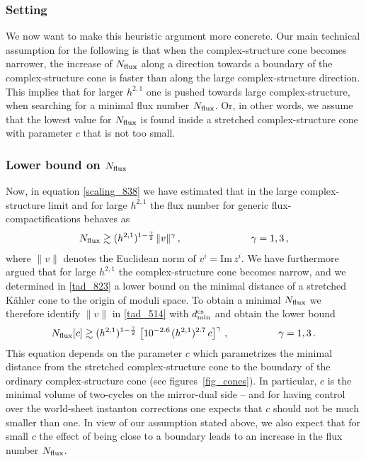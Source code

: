 \documentclass[12pt,a4paper]{article}
\newcommand{\eq}[1]{\begin{equation}
                     \begin{split} #1 \end{split}
                     \end{equation}}
\newcommand{\op}{\hspace{1pt}}
\numberwithin{equation}{section}
\begin{document}
\subsubsection*{Setting}


We now want to make this heuristic argument more concrete. 
Our main technical assumption for the following is that when the 
complex-structure cone becomes narrower, the increase of $N_{\rm flux}$ 
along a direction towards a boundary of the complex-structure cone is faster than
along the large complex-structure direction. 
This implies that for larger $h^{2,1}$ one is pushed towards large 
complex-structure, when searching for a minimal flux number $N_{\rm flux}$.
Or, in other words, we assume that the lowest value for $N_{\rm flux}$ is found 
inside a stretched complex-structure cone with parameter $c$ that is not too small.




\subsubsection*{Lower bound on $N_{\rm flux}$}


Now, in equation \eqref{scaling_838} we have estimated that 
in the large complex-structure limit and for large $h^{2,1}$ 
the flux number for generic flux-compactifications behaves as
\eq{
  \label{tad_514}
 N_{\rm flux} \gtrsim (h^{2,1})^{1-\frac{\gamma}{2}} \op \lVert v \rVert^{\gamma} \,, \hspace{70pt}
 \gamma=1,3\,,
}
where $\lVert v \rVert$ denotes the Euclidean norm of $v^i = \mbox{Im}\, z^i$. 
We have furthermore argued that for large $h^{2,1}$ the complex-structure 
cone becomes narrow, and we determined in \eqref{tad_823} a lower bound on the minimal distance 
of a stretched K\"ahler cone to the origin of moduli space.
To obtain a minimal $N_{\rm flux}$ we therefore identify  $\lVert v \rVert$ in \eqref{tad_514} 
with $ d^{\rm cs}_{\rm min}$
and obtain the lower bound
\eq{
\label{tad_bound_004}
 N_{\rm flux}[c] \gtrsim (h^{2,1})^{1-\frac{\gamma}{2}}  \op \left[ 
10^{-2.6} \op (h^{2,1})^{2.7}\, c\right]^{\gamma} \,,
\hspace{50pt}
 \gamma=1,3\,.
}
This equation  depends on 
the parameter $c$ which parametrizes the minimal distance from
the stretched complex-structure cone to the boundary of 
the ordinary complex-structure cone (see figures~\ref{fig_cones}).
In particular, $c$ is the minimal volume of two-cycles 
on the mirror-dual side -- and for having control over the world-sheet instanton 
corrections one expects 
that $c$ should not be much smaller than one. 
In view of our assumption stated above, we also expect that for small $c$ the effect 
of being close to a boundary 
leads to an increase in the flux number $N_{\rm flux}$.
\end{document}
